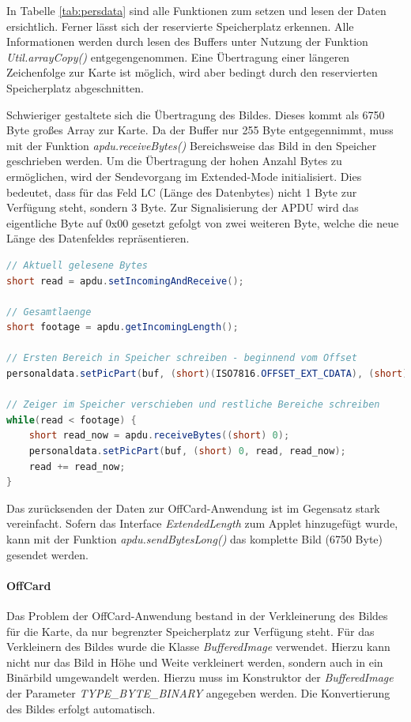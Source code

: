 \documentclass[	a4paper,
			11pt,
			oneside,
			parskip]{scrartcl}
\begin{document}
In Tabelle \ref{tab:persdata} sind alle Funktionen zum setzen und lesen der Daten ersichtlich. Ferner lässt sich der reservierte Speicherplatz erkennen. Alle Informationen werden durch lesen des Buffers unter Nutzung der Funktion \textit{Util.arrayCopy()} entgegengenommen. Eine Übertragung einer längeren Zeichenfolge zur Karte ist möglich, wird aber bedingt durch den reservierten Speicherplatz abgeschnitten. \medskip

Schwieriger gestaltete sich die Übertragung des Bildes. Dieses kommt als 6750 Byte großes Array zur Karte. Da der Buffer nur 255 Byte entgegennimmt, muss mit der Funktion \textit{apdu.receiveBytes()} Bereichsweise das Bild in den Speicher geschrieben werden. Um die Übertragung der hohen Anzahl Bytes zu ermöglichen, wird der Sendevorgang im Extended-Mode initialisiert. Dies bedeutet, dass für das Feld LC (Länge des Datenbytes) nicht 1 Byte zur Verfügung steht, sondern 3 Byte. Zur Signalisierung der APDU wird das eigentliche Byte auf 0x00 gesetzt gefolgt von zwei weiteren Byte, welche die neue Länge des Datenfeldes repräsentieren.

\begin{center}
\begin{minipage}{0.9\textwidth} 
\begin{lstlisting}[language=Java]
// Aktuell gelesene Bytes
short read = apdu.setIncomingAndReceive();

// Gesamtlaenge
short footage = apdu.getIncomingLength();
	
// Ersten Bereich in Speicher schreiben - beginnend vom Offset		
personaldata.setPicPart(buf, (short)(ISO7816.OFFSET_EXT_CDATA), (short) 0, read);

// Zeiger im Speicher verschieben und restliche Bereiche schreiben		
while(read < footage) {
	short read_now = apdu.receiveBytes((short) 0);
	personaldata.setPicPart(buf, (short) 0, read, read_now);
	read += read_now;
}\end{lstlisting}
\end{minipage}
\end{center}

Das zurücksenden der Daten zur OffCard-Anwendung ist im Gegensatz stark vereinfacht. Sofern das Interface \textit{ExtendedLength} zum Applet hinzugefügt wurde, kann mit der Funktion \textit{apdu.sendBytesLong()} das komplette Bild (6750 Byte) gesendet werden.

\paragraph{OffCard} Das Problem der OffCard-Anwendung bestand in der Verkleinerung des Bildes für die Karte, da nur begrenzter Speicherplatz zur Verfügung steht. Für das Verkleinern des Bildes wurde die Klasse \textit{BufferedImage} verwendet. Hierzu kann nicht nur das Bild in Höhe und Weite verkleinert werden, sondern auch in ein Binärbild umgewandelt werden. Hierzu muss im Konstruktor der \textit{BufferedImage} der Parameter \textit{TYPE\_BYTE\_BINARY} angegeben werden. Die Konvertierung des Bildes erfolgt automatisch.
\end{document}
